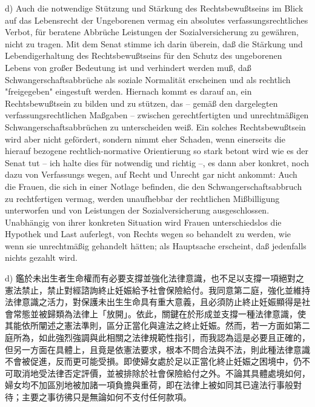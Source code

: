 \documentclass[12pt]{article}
\begin{document}
\begin{sourcepara}[title={原文SondervotumB.327}]
d) Auch die notwendige Stützung und Stärkung des Rechtsbewußtseins im Blick auf das Lebensrecht der Ungeborenen vermag ein absolutes verfassungsrechtliches Verbot, für beratene Abbrüche Leistungen der Sozialversicherung zu gewähren, nicht zu tragen. Mit dem Senat stimme ich darin überein, daß die Stärkung und Lebendigerhaltung des Rechtsbewußtseins für den Schutz des ungeborenen Lebens von großer Bedeutung ist und verhindert werden muß, daß Schwangerschaftsabbrüche als soziale Normalität erscheinen und als rechtlich "freigegeben" eingestuft werden. Hiernach kommt es darauf an, ein Rechtsbewußtsein zu bilden und zu stützen, das -- gemäß den dargelegten verfassungsrechtlichen Maßgaben -- zwischen gerechtfertigten und unrechtmäßigen Schwangerschaftsabbrüchen zu unterscheiden weiß. Ein solches Rechtsbewußtsein wird aber nicht gefördert, sondern nimmt eher Schaden, wenn einerseits die hierauf bezogene rechtlich-normative Orientierung so stark betont wird wie es der Senat tut -- ich halte dies für notwendig und richtig --, es dann aber konkret, noch dazu von Verfassungs wegen, auf Recht und Unrecht gar nicht ankommt: Auch die Frauen, die sich in einer Notlage befinden, die den Schwangerschaftsabbruch zu rechtfertigen vermag, werden unaufhebbar der rechtlichen Mißbilligung unterworfen und von Leistungen der Sozialversicherung ausgeschlossen. Unabhängig von ihrer konkreten Situation wird Frauen unterschiedslos die Hypothek und Last auferlegt, von Rechts wegen so behandelt zu werden, wie wenn sie unrechtmäßig gehandelt hätten; als Hauptsache erscheint, daß jedenfalls nichts gezahlt wird.
\end{sourcepara}
\begin{transpara}
d) 鑑於未出生者生命權而有必要支撐並強化法律意識，也不足以支撐一項絕對之憲法禁止，禁止對經諮詢終止妊娠給予社會保險給付。我同意第二庭，強化並維持法律意識之活力，對保護未出生生命具有重大意義，且必須防止終止妊娠顯得是社會常態並被歸類為法律上「放開」。依此，關鍵在於形成並支撐一種法律意識，使其能依所闡述之憲法準則，區分正當化與違法之終止妊娠。然而，若一方面如第二庭所為，如此強烈強調與此相關之法律規範性指引，而我認為這是必要且正確的，但另一方面在具體上，且竟是依憲法要求，根本不問合法與不法，則此種法律意識不會被促進，反而更可能受損。即使婦女處於足以正當化終止妊娠之困境中，仍不可取消地受法律否定評價，並被排除於社會保險給付之外。不論其具體處境如何，婦女均不加區別地被加諸一項負擔與重荷，即在法律上被如同其已違法行事般對待；主要之事彷彿只是無論如何不支付任何款項。
\end{transpara}
\end{document}
